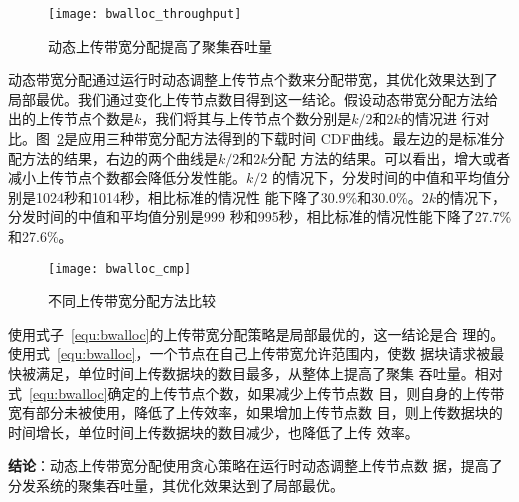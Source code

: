 \begin{figure}[htbp]
  \centering
  \begin{minipage}{0.6\linewidth}
    \centering
    \texttt{[image: bwalloc\_throughput]}
    \caption{动态上传带宽分配提高了聚集吞吐量}
    \label{fig:bwalloc_throughput}
  \end{minipage}
\end{figure}


动态带宽分配通过运行时动态调整上传节点个数来分配带宽，其优化效果达到了
局部最优。我们通过变化上传节点数目得到这一结论。假设动态带宽分配方法给
出的上传节点个数是$k$，我们将其与上传节点个数分别是$k/2$和$2k$的情况进
行对比。图~\ref{fig:bwalloc_cmp}是应用三种带宽分配方法得到的下载时间
CDF曲线。最左边的是标准分配方法的结果，右边的两个曲线是$k/2$和$2k$分配
方法的结果。可以看出，增大或者减小上传节点个数都会降低分发性能。$k/2$
的情况下，分发时间的中值和平均值分别是1024秒和1014秒，相比标准的情况性
能下降了30.9\%和30.0\%。$2k$的情况下，分发时间的中值和平均值分别是999
秒和995秒，相比标准的情况性能下降了27.7\%和27.6\%。

\begin{figure}[htbp]
  \centering
  \begin{minipage}{0.6\linewidth}
    \centering
    \texttt{[image: bwalloc\_cmp]}
    \caption{不同上传带宽分配方法比较}
    \label{fig:bwalloc_cmp}
  \end{minipage}
\end{figure}

使用式子~\ref{equ:bwalloc}的上传带宽分配策略是局部最优的，这一结论是合
理的。使用式~\ref{equ:bwalloc}，一个节点在自己上传带宽允许范围内，使数
据块请求被最快被满足，单位时间上传数据块的数目最多，从整体上提高了聚集
吞吐量。相对式~\ref{equ:bwalloc}确定的上传节点个数，如果减少上传节点数
目，则自身的上传带宽有部分未被使用，降低了上传效率，如果增加上传节点数
目，则上传数据块的时间增长，单位时间上传数据块的数目减少，也降低了上传
效率。

\textbf{结论}：动态上传带宽分配使用贪心策略在运行时动态调整上传节点数
据，提高了分发系统的聚集吞吐量，其优化效果达到了局部最优。

%

